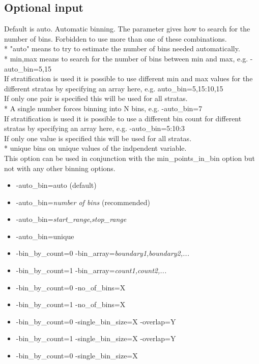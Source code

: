 \subsection{Optional input}
\begin{optionlist}
Default is auto.
Automatic binning. The parameter gives how to search for the number of bins. Forbidden to use more than one of these combinations.\\
* "auto" means to try to estimate the number of bins needed automatically.\\
* min,max means to search for the number of bins between min and max, e.g. -auto\_bin=5,15\\
If stratification is used it is possible to use different min and max values for the different stratas by specifying an array here, e.g. 
auto\_bin=5,15:10,15\\
If only one pair is specified this will be used for all stratas.\\
* A single number forces binning into N bins, e.g. -auto\_bin=7\\
If stratification is used it is possible to use a different bin count for different stratas by specifying an array here, e.g. -auto\_bin=5:10:3\\
If only one value is specified this will be used for all stratas.\\
* unique bins on unique values of the indpendent variable.\\
This option can be used in conjunction with the min\_points\_in\_bin option but not with any other binning options.
\begin{itemize}
	\item -auto\_bin=auto (default)
	\item -auto\_bin=\emph{number of bins} (recommended)
	\item -auto\_bin=\emph{start\_range},\emph{stop\_range}
	\item -auto\_bin=unique
	\item -bin\_by\_count=0 -bin\_array=\emph{boundary1,boundary2,...}
	\item -bin\_by\_count=1 -bin\_array=\emph{count1,count2,...}
	\item -bin\_by\_count=0 -no\_of\_bins=X
	\item -bin\_by\_count=1 -no\_of\_bins=X
	\item -bin\_by\_count=0 -single\_bin\_size=X -overlap=Y
	\item -bin\_by\_count=1 -single\_bin\_size=X -overlap=Y
	\item -bin\_by\_count=0 -single\_bin\_size=X

\end{itemize}
\end{optionlist}
